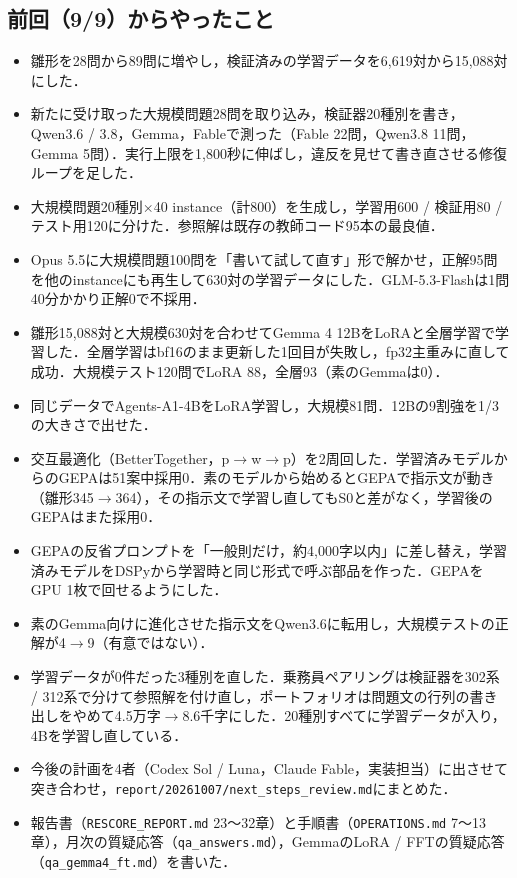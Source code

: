\documentclass[12pt,a4paper]{article}
\begin{document}
\subsection{前回（9/9）からやったこと}

\begin{itemize}
  \item 雛形を28問から89問に増やし，検証済みの学習データを6,619対から15,088対にした．
  \item 新たに受け取った大規模問題28問を取り込み，検証器20種別を書き，Qwen3.6 / 3.8，Gemma，Fableで測った（Fable 22問，Qwen3.8 11問，Gemma 5問）．実行上限を1,800秒に伸ばし，違反を見せて書き直させる修復ループを足した．
  \item 大規模問題20種別$\times$40 instance（計800）を生成し，学習用600 / 検証用80 / テスト用120に分けた．参照解は既存の教師コード95本の最良値．
  \item Opus 5.5に大規模問題100問を「書いて試して直す」形で解かせ，正解95問を他のinstanceにも再生して630対の学習データにした．GLM-5.3-Flashは1問40分かかり正解0で不採用．
  \item 雛形15,088対と大規模630対を合わせてGemma 4 12BをLoRAと全層学習で学習した．全層学習はbf16のまま更新した1回目が失敗し，fp32主重みに直して成功．大規模テスト120問でLoRA 88，全層93（素のGemmaは0）．
  \item 同じデータでAgents-A1-4BをLoRA学習し，大規模81問．12Bの9割強を1/3の大きさで出せた．
  \item 交互最適化（BetterTogether，p$\rightarrow$w$\rightarrow$p）を2周回した．学習済みモデルからのGEPAは51案中採用0．素のモデルから始めるとGEPAで指示文が動き（雛形345$\rightarrow$364），その指示文で学習し直してもS0と差がなく，学習後のGEPAはまた採用0．
  \item GEPAの反省プロンプトを「一般則だけ，約4,000字以内」に差し替え，学習済みモデルをDSPyから学習時と同じ形式で呼ぶ部品を作った．GEPAをGPU 1枚で回せるようにした．
  \item 素のGemma向けに進化させた指示文をQwen3.6に転用し，大規模テストの正解が4$\rightarrow$9（有意ではない）．
  \item 学習データが0件だった3種別を直した．乗務員ペアリングは検証器を302系 / 312系で分けて参照解を付け直し，ポートフォリオは問題文の行列の書き出しをやめて4.5万字$\rightarrow$8.6千字にした．20種別すべてに学習データが入り，4Bを学習し直している．
  \item 今後の計画を4者（Codex Sol / Luna，Claude Fable，実装担当）に出させて突き合わせ，\texttt{report/20261007/next\_steps\_review.md}にまとめた．
  \item 報告書（\texttt{RESCORE\_REPORT.md} 23〜32章）と手順書（\texttt{OPERATIONS.md} 7〜13章），月次の質疑応答（\texttt{qa\_answers.md}），GemmaのLoRA / FFTの質疑応答（\texttt{qa\_gemma4\_ft.md}）を書いた．
\end{itemize}
\end{document}
